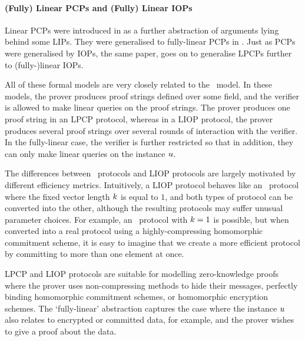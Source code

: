 \paragraph{(Fully) Linear PCPs and (Fully) Linear IOPs}

Linear PCPs were introduced in \cite{BitanskyCIPO13} as a further abstraction of arguments lying behind some LIPs. They were generalised to fully-linear PCPs in \cite{BonehBCGI19}. Just as PCPs were generalised by IOPs, the same paper, \cite{BonehBCGI19} goes on to generalise LPCPs further to (fully-)linear IOPs.

All of these formal models are very closely related to the \ILC\ model. In these models, the prover produces proof strings defined over some field, and the verifier is allowed to make linear queries on the proof strings. The prover produces one proof string in an LPCP protocol, whereas in a LIOP protocol, the prover produces several proof strings over several rounds of interaction with the verifier. In the fully-linear case, the verifier is further restricted so that in addition, they can only make linear queries on the instance $u$.

The differences between \ILC\ protocols and LIOP protocols are largely motivated by different efficiency metrics. Intuitively, a LIOP protocol behaves like an \ILC\ protocol where the fixed vector length $k$ is equal to $1$, and both types of protocol can be converted into the other, although the resulting protocols may suffer unusual parameter choices. For example, an \ILC\ protocol with $k = 1$ is possible, but when converted into a real protocol using a highly-compressing homomorphic commitment scheme, it is easy to imagine that we create a more efficient protocol by committing to more than one element at once.

LPCP and LIOP protocols are suitable for modelling zero-knowledge proofs where the prover uses non-compressing methods to hide their messages, perfectly binding homomorphic commitment schemes, or homomorphic encryption schemes. The `fully-linear' abstraction captures the case where the instance $u$ also relates to encrypted or committed data, for example, and the prover wishes to give a proof about the data.